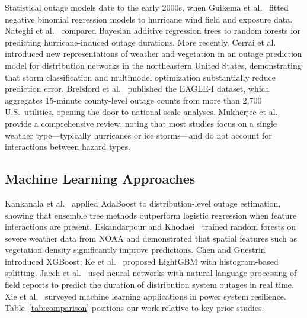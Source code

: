 \documentclass[conference]{IEEEtran}
\begin{document}
Statistical outage models date to the early 2000s, when Guikema et al.~\cite{guikema2010prestorm} fitted negative binomial regression models to hurricane wind field and exposure data. Nateghi et al.~\cite{nateghi2011comparison} compared Bayesian additive regression trees to random forests for predicting hurricane-induced outage durations. More recently, Cerrai et al.~\cite{cerrai2019predicting} introduced new representations of weather and vegetation in an outage prediction model for distribution networks in the northeastern United States, demonstrating that storm classification and multimodel optimization substantially reduce prediction error. Brelsford et al.~\cite{brelsford2024eaglei} published the EAGLE-I dataset, which aggregates 15-minute county-level outage counts from more than 2{,}700 U.S.\ utilities, opening the door to national-scale analyses. Mukherjee et al.~\cite{mukherjee2018review} provide a comprehensive review, noting that most studies focus on a single weather type---typically hurricanes or ice storms---and do not account for interactions between hazard types.

\subsection{Machine Learning Approaches}

Kankanala et al.~\cite{kankanala2014adaboost} applied AdaBoost to distribution-level outage estimation, showing that ensemble tree methods outperform logistic regression when feature interactions are present. Eskandarpour and Khodaei~\cite{eskandarpour2017machine} trained random forests on severe weather data from NOAA and demonstrated that spatial features such as vegetation density significantly improve predictions. Chen and Guestrin~\cite{chen2016xgboost} introduced XGBoost; Ke et al.~\cite{ke2017lightgbm} proposed LightGBM with histogram-based splitting. Jaech et al.~\cite{jaech2019outage} used neural networks with natural language processing of field reports to predict the duration of distribution system outages in real time. Xie et al.~\cite{xie2020review} surveyed machine learning applications in power system resilience. Table~\ref{tab:comparison} positions our work relative to key prior studies.
\end{document}
